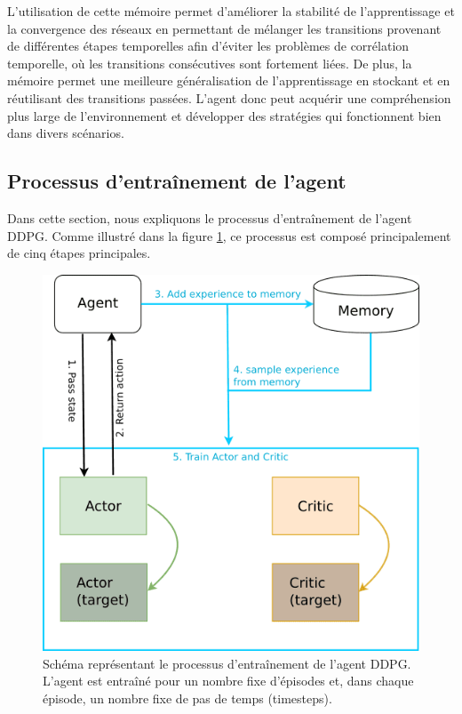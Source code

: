 L'utilisation de cette mémoire permet d'améliorer la stabilité de l'apprentissage et la convergence des réseaux en permettant de mélanger les transitions provenant de différentes étapes temporelles afin d'éviter les problèmes de corrélation temporelle, où les transitions consécutives sont fortement liées. De plus, la mémoire permet une meilleure généralisation de l'apprentissage en stockant et en réutilisant des transitions passées. L'agent donc peut acquérir une compréhension plus large de l'environnement et développer des stratégies qui fonctionnent bien dans divers scénarios.

\subsection{Processus d'entraînement de l'agent}
Dans cette section, nous expliquons le processus d'entraînement de l'agent DDPG. Comme illustré dans la figure \ref{fig:ddpg-flow}, ce processus est composé principalement de cinq étapes principales.

\begin{figure}[hbt!]
  \centering
  \includegraphics[width=13cm]{images_pfe/ddpgflow.png}
  \caption{Schéma représentant le processus d'entraînement de l'agent DDPG. L'agent est entraîné pour un nombre fixe d'épisodes et, dans chaque épisode, un nombre fixe de pas de temps (timesteps).}
  \label{fig:ddpg-flow}
\end{figure}
\FloatBarrier
\medskip

